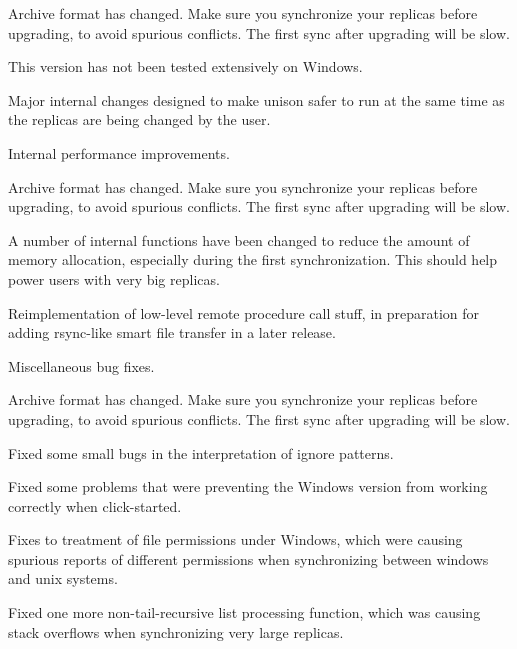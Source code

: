 \begin{changesfromversion}{1.200}
\item \incompatible{} Archive format has changed.  Make sure you
synchronize your replicas before upgrading, to avoid spurious
conflicts.  The first sync after upgrading will be slow.

\item This version has not been tested extensively on Windows.

\item Major internal changes designed to make unison safer to run
at the same time as the replicas are being changed by the user.

\item Internal performance improvements.
\end{changesfromversion}

\begin{changesfromversion}{1.190}
\item \incompatible{} Archive format has changed.  Make sure you
synchronize your replicas before upgrading, to avoid spurious
conflicts.  The first sync after upgrading will be slow.

\item A number of internal functions have been changed to reduce the
amount of memory allocation, especially during the first
synchronization.  This should help power users with very big replicas.

\item Reimplementation of low-level remote procedure call stuff, in
preparation for adding rsync-like smart file transfer in a later
release.

\item Miscellaneous bug fixes.
\end{changesfromversion}

\begin{changesfromversion}{1.180}
\item \incompatible{} Archive format has changed.  Make sure you
synchronize your replicas before upgrading, to avoid spurious
conflicts.  The first sync after upgrading will be slow.

\item Fixed some small bugs in the interpretation of ignore patterns.

\item Fixed some problems that were preventing the Windows version
from working correctly when click-started.

\item Fixes to treatment of file permissions under Windows, which were
causing spurious reports of different permissions when synchronizing
between windows and unix systems.

\item Fixed one more non-tail-recursive list processing function,
which was causing stack overflows when synchronizing very large
replicas.
\end{changesfromversion}


